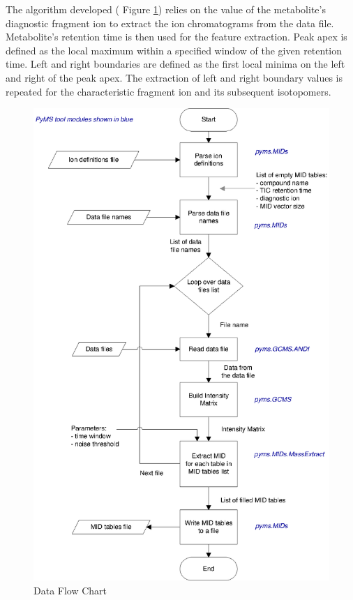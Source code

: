 The algorithm developed ( Figure \ref{fig:pymsMIDs}) relies on the value of the metabolite’s diagnostic
fragment ion to extract the ion chromatograms from the data file.
Metabolite’s retention time is then used for the feature extraction. Peak
apex is defined as the local maximum within a specified window of the given
retention time. Left and right boundaries are defined as the first local minima on
the left and right of the peak apex. The extraction of left and right boundary
values is repeated for the characteristic fragment ion and its subsequent
isotopomers.

\begin{figure}
  \begin{center}
    \includegraphics[scale=0.33]{graphics/chapter08/pymsMIDs.eps}
  \end{center}
  \caption{Data Flow Chart}
  \label{fig:pymsMIDs}
\end{figure}

